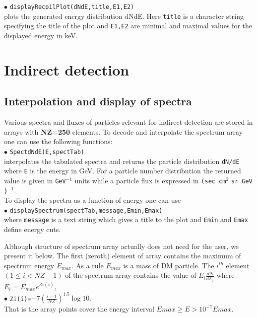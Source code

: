 \documentclass[12pt,a4paper]{article}
\begin{document}
\noindent
$\bullet$ \verb|displayRecoilPlot(dNdE,title,E1,E2)|\\
plots the  generated energy distribution dNdE. Here \verb|title|
is a character string specifying the title of the plot and
\verb|E1,E2| are minimal and maximal values for the displayed
energy in keV.

\section{Indirect detection}




\subsection{Interpolation and display of spectra}
Various spectra and fluxes  of particles  relevant for indirect detection are stored in
arrays with {\bf NZ=250} elements. To decode and interpolate the spectrum array
one can use the following functions:\\
$\bullet$  \verb|SpectdNdE(E,spectTab)|\\
interpolates the tabulated spectra  and returns the 
particle distribution \verb|dN/dE|  where \verb|E| is the energy  in GeV. 
For a particle number  distribution the returned value is given in \verb|GeV|$^{-1}$
units while  a particle flux is expressed in \verb|(sec cm|$^2$ \verb|sr GeV )|$^{-1}$.\\
To display the  spectra  as a function of energy one can use \\
$\bullet$ \verb|displaySpectrum(spectTab,message,Emin,Emax)|\\
where  \verb|message| is a text string which gives a title to the  
plot and  \verb|Emin| and \verb|Emax| define  energy cuts.

Although structure of spectrum array actually does not need  for the user, we present it below.
The first (zeroth) element of array contains the maximum of spectrum energy $E_{max}$. As a rule   $E_{max}$ is a mass of DM particle.    
The $i^{th}$ element $(1\le i < NZ-1)$ of the spectrum array contains
the value of $E_i \frac{ dN}{dE_i} $ where  $E_i=E_{max} e^{Zi(i)}$,\\   
$\bullet$ \verb|Zi(i)=|$ -7\left(\frac{i-1}{NZ}\right)^{1.5}\log10$.\\
 That is the
array points cover the  energy interval  $ Emax \ge E > 10^{-7}Emax$. 
\end{document}
